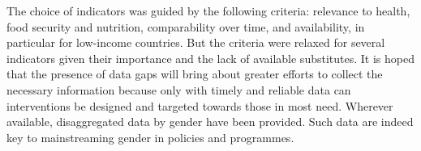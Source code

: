 The choice of indicators was guided by the following criteria: relevance to health, food security and nutrition, comparability over time, and availability, in particular for low-income countries. But the criteria were relaxed for several indicators given their importance and the lack of available substitutes. It is hoped that the presence of data gaps will bring about greater efforts to collect the necessary information because only with timely and reliable data can interventions be designed and targeted towards those in most need. Wherever available, disaggregated data by gender have been provided. Such data are indeed key to mainstreaming gender in policies and programmes.
